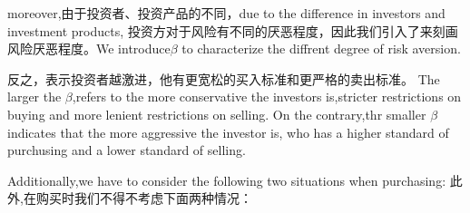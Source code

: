 \documentclass{mcmthesis}
\begin{document}
moreover,由于投资者、投资产品的不同，due to the difference in investors and investment products,
投资方对于风险有不同的厌恶程度，因此我们引入了来刻画风险厌恶程度。We introduce$\beta $ to characterize the diffrent degree of risk aversion.

反之，表示投资者越激进，他有更宽松的买入标准和更严格的卖出标准。
The larger the $\beta $,refers to the more conservative the investors is,stricter restrictions on buying and more lenient restrictions on selling.
On the contrary,thr smaller $\beta $ indicates that the more aggressive the investor is, who has a higher standard of purchusing and a lower standard of selling.


Additionally,we have to consider the following two situations when purchasing:
此外,在购买时我们不得不考虑下面两种情况：
\end{document}
